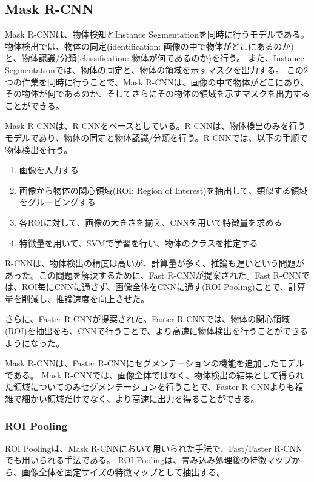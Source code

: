 \documentclass{ltjsarticle}
\begin{document}
\subsection{Mask R-CNN}
Mask R-CNNは、物体検知とInstance Segmentationを同時に行うモデルである。
物体検出では、物体の同定(identification: 画像の中で物体がどこにあるのか)と、物体認識/分類(classification: 物体が何であるのか)を行う。
また、Instance Segmentationでは、物体の同定と、物体の領域を示すマスクを出力する。
この2つの作業を同時に行うことで、Mask R-CNNは、画像の中で物体がどこにあり、その物体が何であるのか、そしてさらにその物体の領域を示すマスクを出力することができる。
\par
Mask R-CNNは、R-CNNをベースとしている。R-CNNは、物体検出のみを行うモデルであり、物体の同定と物体認識/分類を行う。R-CNNでは、以下の手順で物体検出を行う。
\begin{enumerate}
  \item 画像を入力する
  \item 画像から物体の関心領域(ROI: Region of Interest)を抽出して、類似する領域をグルーピングする
  \item 各ROIに対して、画像の大きさを揃え、CNNを用いて特徴量を求める
  \item 特徴量を用いて、SVMで学習を行い、物体のクラスを推定する
\end{enumerate}
R-CNNは、物体検出の精度は高いが、計算量が多く、推論も遅いという問題があった。この問題を解決するために、Fast R-CNNが提案された。Fast R-CNNでは、ROI毎にCNNに通さず、画像全体をCNNに通す(ROI Pooling)ことで、計算量を削減し、推論速度を向上させた。
\par
さらに、Faster R-CNNが提案された。Faster R-CNNでは、物体の関心領域(ROI)を抽出をも、CNNで行うことで、より高速に物体検出を行うことができるようになった。
\par
Mask R-CNNは、Faster R-CNNにセグメンテーションの機能を追加したモデルである。
Mask R-CNNでは、画像全体ではなく、物体検出の結果として得られた領域についてのみセグメンテーションを行うことで、Faster R-CNNよりも複雑で細かい領域だけでなく、より高速に出力を得ることができる。

\subsubsection{ROI Pooling}
ROI Poolingは、Mask R-CNNにおいて用いられた手法で、Fast/Faster R-CNNでも用いられる手法である。
ROI Poolingは、畳み込み処理後の特徴マップから、画像全体を固定サイズの特徴マップとして抽出する。
\end{document}
